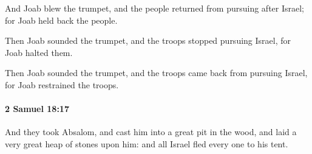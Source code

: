 			\begin{versebox}
					\item[BHS] 
					\item[ASV] And Joab blew the trumpet, and the people returned from pursuing after Israel; for Joab held back the people.
					\item[NIV] Then Joab sounded the trumpet, and the troops stopped pursuing Israel, for Joab halted them.
					\item[NRSV] Then Joab sounded the trumpet, and the troops came back from pursuing Israel, for Joab restrained the troops.
			\end{versebox}

		\paragraph{2 Samuel 18:17} %
			\label{2SAMUEL-18-17}

			And they took Absalom, and cast him into a great pit in the wood, and laid a very great heap of stones upon him: and all Israel fled every one to his tent.

